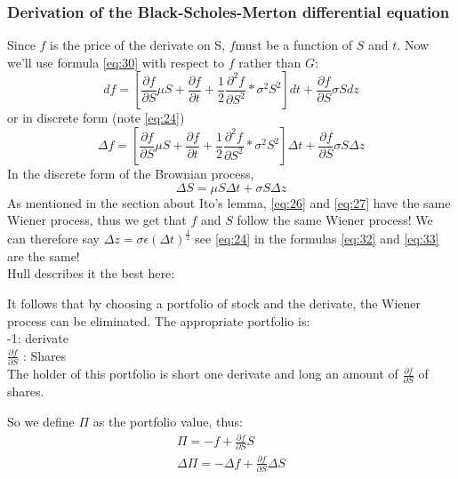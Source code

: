 \documentclass{article}
\begin{document}
\subsubsection{Derivation of the Black-Scholes-Merton differential equation}
Since $f$ is the price of the derivate on S, $f$must be a function of $S$ and $t$. Now we’ll use formula \ref{eq:30} with respect to $f$ rather than $G$:
\begin{equation} \label{eq:31}
    df = \left[\frac{\partial f }{\partial S} \mu S + \frac{\partial f }{\partial t} + \frac{1}{2}\frac{\partial^{2} f }{\partial S^{2}} * \sigma^{2} S^{2}\right]dt + \frac{\partial f }{\partial S} \sigma S dz
\end{equation}
or in discrete form (note \ref{eq:24})
\begin{equation} \label{eq:32}
    \Delta f = \left[\frac{\partial f }{\partial S} \mu S + \frac{\partial f }{\partial t} + \frac{1}{2}\frac{\partial^{2} f }{\partial S^{2}} * \sigma^{2} S^{2}\right]\Delta t + \frac{\partial f }{\partial S} \sigma S \Delta z
\end{equation}
In the discrete form of the Brownian process, 
\begin{equation}\label{eq:33}
        \Delta S = \mu S \Delta t + \sigma S \Delta z
    \end{equation}
As mentioned in the section about Ito’s lemma, \ref{eq:26} and \ref{eq:27} have the same Wiener process, thus we get that $f$ and $S$ follow the same Wiener process! We can therefore say $\Delta z = \sigma \epsilon (\Delta t)^{\frac{1}{2}}$ see \ref{eq:24} in the formulas \ref{eq:32} and \ref{eq:33} are the same! \\ [2ex]
Hull describes it the best here:
\begin{displayquote}
It follows that by choosing a portfolio of stock and the derivate, the Wiener process can be eliminated. The appropriate portfolio is: \\
-1: derivate\\
$\frac{\partial f }{\partial S} $ : Shares\\ [2ex]
The holder of this portfolio is short one derivate and long an amount of $\frac{\partial f }{\partial S}$ of shares.
\end{displayquote}
So we define $\Pi$ as the portfolio value, thus:
\begin{equation}\label{eq:34}
\begin{split}
    \Pi = -f + \frac{\partial f }{\partial S} S \\
    \Delta \Pi = -\Delta f + \frac{\partial f }{\partial S} \Delta S
\end{split}
\end{equation}
\end{document}
